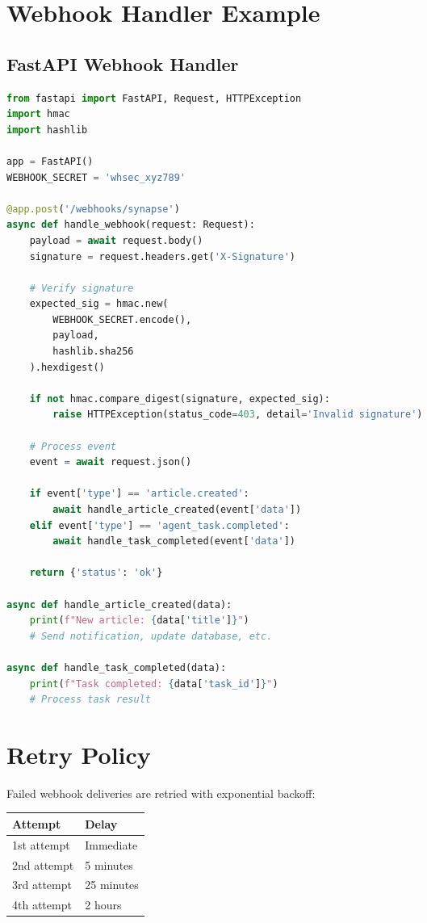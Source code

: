 \documentclass{report}
\begin{document}
\section{Webhook Handler Example}

\subsection{FastAPI Webhook Handler}

\begin{lstlisting}[language=Python]
from fastapi import FastAPI, Request, HTTPException
import hmac
import hashlib

app = FastAPI()
WEBHOOK_SECRET = 'whsec_xyz789'

@app.post('/webhooks/synapse')
async def handle_webhook(request: Request):
    payload = await request.body()
    signature = request.headers.get('X-Signature')
    
    # Verify signature
    expected_sig = hmac.new(
        WEBHOOK_SECRET.encode(),
        payload,
        hashlib.sha256
    ).hexdigest()
    
    if not hmac.compare_digest(signature, expected_sig):
        raise HTTPException(status_code=403, detail='Invalid signature')
    
    # Process event
    event = await request.json()
    
    if event['type'] == 'article.created':
        await handle_article_created(event['data'])
    elif event['type'] == 'agent_task.completed':
        await handle_task_completed(event['data'])
    
    return {'status': 'ok'}

async def handle_article_created(data):
    print(f"New article: {data['title']}")
    # Send notification, update database, etc.

async def handle_task_completed(data):
    print(f"Task completed: {data['task_id']}")
    # Process task result
\end{lstlisting}

\section{Retry Policy}

Failed webhook deliveries are retried with exponential backoff:

\begin{center}
\begin{tabular}{ll}
\toprule
\textbf{Attempt} & \textbf{Delay} \\
\midrule
1st attempt & Immediate \\
2nd attempt & 5 minutes \\
3rd attempt & 25 minutes \\
4th attempt & 2 hours \\
\bottomrule
\end{tabular}
\end{center}
\end{document}
